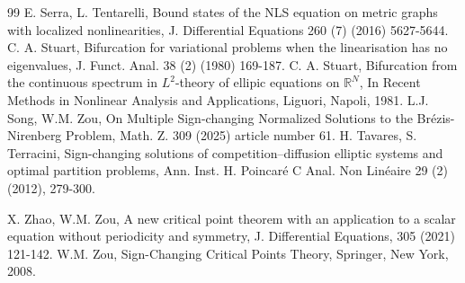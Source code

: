 \documentclass[10pt,a4paper]{article}
\theoremstyle{definition} \theoremstyle{remark}
\numberwithin{equation}{section}
\newcommand{\R}{\mathbb{R}}
\begin{document}
\begin{thebibliography}{99}
	  E. Serra, L. Tentarelli, Bound states of the NLS equation on metric graphs with localized nonlinearities, J. Differential Equations 260 (7) (2016) 5627-5644.
	  C. A. Stuart, Bifurcation for variational problems when the linearisation has no eigenvalues, J. Funct. Anal. 38 (2) (1980) 169-187.
	  C. A. Stuart, Bifurcation from the continuous spectrum in $L^2$-theory of ellipic equations on $\R^N$, In Recent Methods in Nonlinear Analysis and Applications, Liguori, Napoli, 1981. 
      L.J. Song, W.M. Zou, On Multiple Sign-changing Normalized Solutions to the Br\'ezis-Nirenberg Problem,  Math. Z. 309 (2025) article number 61.
  H. Tavares, S. Terracini, Sign-changing solutions of competition–diffusion elliptic systems and optimal partition problems, Ann. Inst. H. Poincar\'e C Anal. Non Lin\'eaire 29 (2) (2012), 279-300.

      X. Zhao, W.M. Zou, A new critical point theorem with an application to a scalar equation without periodicity and symmetry, J. Differential Equations, 305 (2021) 121-142.
     W.M. Zou, Sign-Changing Critical Points Theory, Springer, New York, 2008.
\end{thebibliography}
\end{document}

